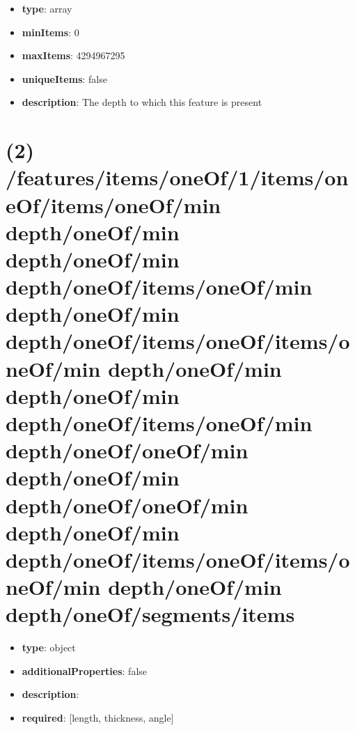 \begin{itemize}[leftmargin=1em]\item {\bf type}: array
\item {\bf minItems}: 0
\item {\bf maxItems}: 4294967295
\item {\bf uniqueItems}: false
\item {\bf description}: The depth to which this feature is present
\end{itemize}\section{(2) /features/items/oneOf/1/items/oneOf/items/oneOf/min depth/oneOf/min depth/oneOf/min depth/oneOf/items/oneOf/min depth/oneOf/min depth/oneOf/items/oneOf/items/oneOf/min depth/oneOf/min depth/oneOf/min depth/oneOf/items/oneOf/min depth/oneOf/oneOf/min depth/oneOf/min depth/oneOf/oneOf/min depth/oneOf/min depth/oneOf/items/oneOf/items/oneOf/min depth/oneOf/min depth/oneOf/segments/items}
\begin{itemize}[leftmargin=2em]\item {\bf type}: object
\item {\bf additionalProperties}: false
\item {\bf description}: 
\item {\bf required}: [length, thickness, angle]\end{itemize}
